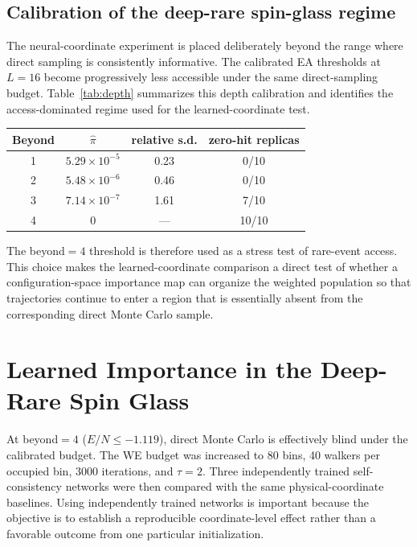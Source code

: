\documentclass[a4paper,fleqn]{cas-sc}
\begin{document}
\subsection{Calibration of the deep-rare spin-glass regime}
The neural-coordinate experiment is placed deliberately beyond the range where direct sampling is consistently informative. The calibrated EA thresholds at $L=16$ become progressively less accessible under the same direct-sampling budget. Table~\ref{tab:depth} summarizes this depth calibration and identifies the access-dominated regime used for the learned-coordinate test.

\begin{center}
\begin{minipage}{0.82\linewidth}
\centering
{}
\label{tab:depth}
\begin{tabular}{cccc}
\toprule
Beyond & $\hat\pi$ & relative s.d. & zero-hit replicas \\
\midrule
1 & $5.29\times10^{-5}$ & 0.23 & 0/10 \\
2 & $5.48\times10^{-6}$ & 0.46 & 0/10 \\
3 & $7.14\times10^{-7}$ & 1.61 & 7/10 \\
4 & 0 & --- & 10/10 \\
\bottomrule
\end{tabular}
\end{minipage}
\end{center}

The beyond$=4$ threshold is therefore used as a stress test of rare-event access. This choice makes the learned-coordinate comparison a direct test of whether a configuration-space importance map can organize the weighted population so that trajectories continue to enter a region that is essentially absent from the corresponding direct Monte Carlo sample.

\section{Learned Importance in the Deep-Rare Spin Glass}
At beyond$=4$ ($E/N\le -1.119$), direct Monte Carlo is effectively blind under the calibrated budget. The WE budget was increased to 80 bins, 40 walkers per occupied bin, 3000 iterations, and $\tau=2$. Three independently trained self-consistency networks were then compared with the same physical-coordinate baselines. Using independently trained networks is important because the objective is to establish a reproducible coordinate-level effect rather than a favorable outcome from one particular initialization.
\end{document}
